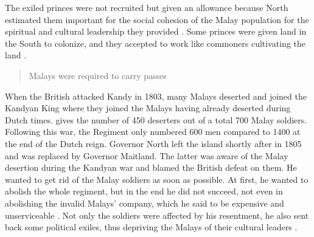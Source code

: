 The exiled princes were not recruited but given an allowance because North estimated them important for the social cohesion of the Malay population for the spiritual and cultural leadership they provided \citep[79]{Hussainmiya1990}. Some princes were given land in the South to colonize, and they accepted to work like commoners cultivating the land \citep[63f]{Hussainmiya1990}.

\begin{quote}
    Malays were required to carry passes \citet[61]{Hussainmiya1990}
\end{quote}

When the British attacked Kandy in 1803, many Malays deserted and
joined the Kandyan King where they joined the Malays having
already deserted during Dutch times. \citet[166]{Codrington1926} gives the number of 450 deserters out of a total 700 Malay soldiers. Following this war, the
Regiment only numbered 600 men \citep[72]{Hussainmiya1990}
compared to 1400 at the end of the Dutch reign. Governor North
left the island shortly after in 1805 and was replaced by Governor
Maitland. The latter was aware of the Malay desertion during the
Kandyan war and blamed the British defeat on them. He wanted to
get rid of the Malay soldiers as soon as possible. At first, he
wanted to abolish the whole regiment, but in the end he did not
succeed, not even in abolishing the invalid Malays' company, which
he said to be expensive and unserviceable
\citep[67,78]{Hussainmiya1990}. Not only the soldiers were
affected by his resentment, he also sent back some political
exiles, thus depriving the Malays of their cultural leaders
\citep[79]{Hussainmiya1990}. 





